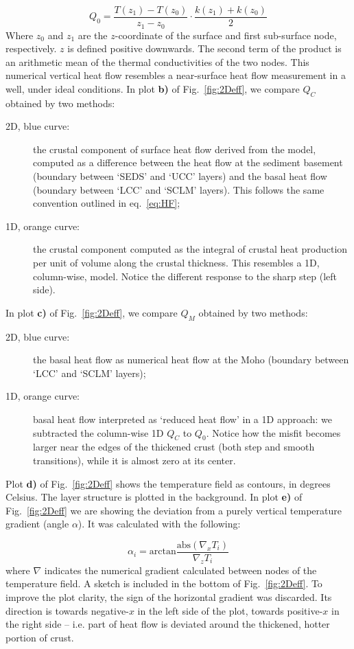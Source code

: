 {\begin{subappendices}
\begin{equation}
    Q_0 = \frac{T(z_1) - T(z_0)}{z_1 - z_0} \cdot \frac{k(z_1) + k(z_0)}{2}
\label{eq:HF}
\end{equation}
Where $z_0$ and $z_1$ are the $z$-coordinate of the surface and first sub-surface node, respectively. $z$ is defined positive downwards.
The second term of the product is an arithmetic mean of the thermal conductivities of the two nodes.
This numerical vertical heat flow resembles a near-surface heat flow measurement in a well, under ideal conditions.
In plot \textbf{b)} of Fig.~\ref{fig:2Deff}, we compare $Q_C$ obtained by two methods:
\begin{description}
	\item[2D, blue curve:] the crustal component of surface heat flow derived from the model, computed as a difference between the heat flow at the sediment basement (boundary between `SEDS' and `UCC' layers) and the basal heat flow (boundary between `LCC' and `SCLM' layers). This follows the same convention outlined in eq.~\ref{eq:HF};
	\item[1D, orange curve:] the crustal component computed as the integral of crustal heat production per unit of volume along the crustal thickness. This  resembles a 1D, column-wise, model. Notice the different response to the sharp step (left side).
\end{description}
In plot \textbf{c)} of Fig.~\ref{fig:2Deff}, we compare $Q_M$ obtained by two methods:
\begin{description}
	\item[2D, blue curve:] the basal heat flow as numerical heat flow at the Moho (boundary between `LCC' and `SCLM' layers);
	\item[1D, orange curve:] basal heat flow interpreted as `reduced heat flow' in a 1D approach: we subtracted the column-wise 1D $Q_C$ to $Q_0$.
	Notice how the misfit becomes larger near the edges of the thickened crust (both step and smooth transitions), while it is almost zero at its center.
\end{description}

Plot \textbf{d)} of Fig.~\ref{fig:2Deff} shows the temperature field as contours, in degrees Celsius.
The layer structure is plotted in the background.
In plot \textbf{e)} of Fig.~\ref{fig:2Deff} we are showing the deviation from a purely vertical temperature gradient (angle $\alpha$).
It was calculated with the following:

\begin{equation}
    \alpha_i = \mathrm{arctan} \frac{\mathrm{abs}\left(\nabla_x T_i \right)}{\nabla_z T_i}
\label{eq:alpha}
\end{equation}
where $\nabla$ indicates the numerical gradient calculated between nodes of the temperature field.
A sketch is included in the bottom of Fig.~\ref{fig:2Deff}.
To improve the plot clarity, the sign of the horizontal gradient was discarded.
Its direction is towards negative-$x$ in the left side of the plot, towards positive-$x$ in the right side -- i.e. part of heat flow is deviated around the thickened, hotter portion of crust.


\end{subappendices}}
